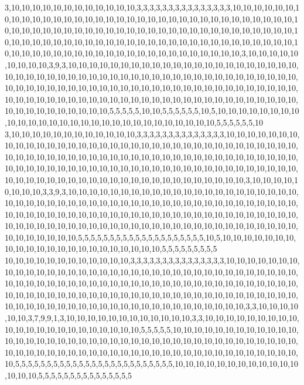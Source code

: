 3,10,10,10,10,10,10,10,10,10,10,10,10,3,3,3,3,3,3,3,3,3,3,3,3,3,3,3,10,10,10,10,10,10,10,10,10,10,10,10,10,10,10,10,10,10,10,10,10,10,10,10,10,10,10,10,10,10,10,10,10,10,10,10,10,10,10,10,10,10,10,10,10,10,10,10,10,10,10,10,10,10,10,10,10,10,10,10,10,10,10,10,10,10,10,10,10,10,10,10,10,10,10,10,10,10,10,10,10,10,10,10,10,10,10,10,10,10,10,10,10,10,10,10,10,10,10,10,10,10,10,10,10,10,10,10,10,10,10,10,10,3,10,10,10,10,10,10,10,10,10,3,9,3,10,10,10,10,10,10,10,10,10,10,10,10,10,10,10,10,10,10,10,10,10,10,10,10,10,10,10,10,10,10,10,10,10,10,10,10,10,10,10,10,10,10,10,10,10,10,10,10,10,10,10,10,10,10,10,10,10,10,10,10,10,10,10,10,10,10,10,10,10,10,10,10,10,10,10,10,10,10,10,10,10,10,10,10,10,10,10,10,10,10,10,10,10,10,10,10,10,10,10,10,10,10,10,10,10,10,10,10,10,10,10,10,10,10,10,10,5,5,5,5,5,10,10,5,5,5,5,5,5,10,5,10,10,10,10,10,10,10,10,10,10,10,10,10,10,10,10,10,10,10,10,10,10,10,10,10,10,10,10,5,5,5,5,5,5,10
3,10,10,10,10,10,10,10,10,10,10,10,10,3,3,3,3,3,3,3,3,3,3,3,3,3,3,10,10,10,10,10,10,10,10,10,10,10,10,10,10,10,10,10,10,10,10,10,10,10,10,10,10,10,10,10,10,10,10,10,10,10,10,10,10,10,10,10,10,10,10,10,10,10,10,10,10,10,10,10,10,10,10,10,10,10,10,10,10,10,10,10,10,10,10,10,10,10,10,10,10,10,10,10,10,10,10,10,10,10,10,10,10,10,10,10,10,10,10,10,10,10,10,10,10,10,10,10,10,10,10,10,10,10,10,10,10,10,10,10,10,3,10,10,10,10,10,10,10,10,3,3,9,3,10,10,10,10,10,10,10,10,10,10,10,10,10,10,10,10,10,10,10,10,10,10,10,10,10,10,10,10,10,10,10,10,10,10,10,10,10,10,10,10,10,10,10,10,10,10,10,10,10,10,10,10,10,10,10,10,10,10,10,10,10,10,10,10,10,10,10,10,10,10,10,10,10,10,10,10,10,10,10,10,10,10,10,10,10,10,10,10,10,10,10,10,10,10,10,10,10,10,10,10,10,10,10,10,10,10,10,10,10,10,10,10,10,5,5,5,5,5,5,5,5,5,5,5,5,5,5,5,5,5,5,5,5,10,5,10,10,10,10,10,10,10,10,10,10,10,10,10,10,10,10,10,10,10,10,10,10,5,5,5,5,5,5,5,5,5
10,10,10,10,10,10,10,10,10,10,10,10,3,3,3,3,3,3,3,3,3,3,3,3,3,3,3,10,10,10,10,10,10,10,10,10,10,10,10,10,10,10,10,10,10,10,10,10,10,10,10,10,10,10,10,10,10,10,10,10,10,10,10,10,10,10,10,10,10,10,10,10,10,10,10,10,10,10,10,10,10,10,10,10,10,10,10,10,10,10,10,10,10,10,10,10,10,10,10,10,10,10,10,10,10,10,10,10,10,10,10,10,10,10,10,10,10,10,10,10,10,10,10,10,10,10,10,10,10,10,10,10,10,10,10,10,10,10,10,10,10,3,3,10,10,10,10,10,10,3,7,9,9,1,3,10,10,10,10,10,10,10,10,10,10,10,10,3,3,10,10,10,10,10,10,10,10,10,10,10,10,10,10,10,10,10,10,10,10,10,10,5,5,5,5,5,10,10,10,10,10,10,10,10,10,10,10,10,10,10,10,10,10,10,10,10,10,10,10,10,10,10,10,10,10,10,10,10,10,10,10,10,10,10,10,10,10,10,10,10,10,10,10,10,10,10,10,10,10,10,10,10,10,10,10,10,10,10,10,10,10,10,10,10,10,5,5,5,5,5,5,5,5,5,5,5,5,5,5,5,5,5,5,5,5,5,5,5,5,5,10,10,10,10,10,10,10,10,10,10,10,10,10,10,10,5,5,5,5,5,5,5,5,5,5,5,5,5,5,5
